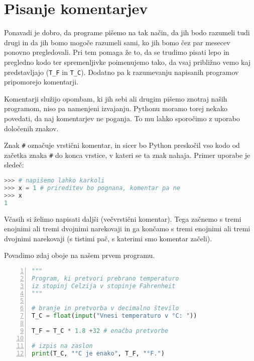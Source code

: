 \section{Pisanje komentarjev}
Ponavadi je dobro, da programe pišemo na tak način, da jih bodo razumeli tudi drugi in da jih bomo mogoče razumeli sami, ko jih bomo čez par mesecev ponovno  pregledovali. Pri tem pomaga že to, da se trudimo pisati lepo in pregledno kodo ter spremenljivke poimenujemo tako, da vsaj približno vemo kaj predstavljajo (\texttt{T\_F} in \texttt{T\_C}). Dodatno pa k razumevanju napisanih programov pripomorejo komentarji.

Komentarji služijo opombam, ki jih sebi ali drugim pišemo znotraj naših programom, niso pa namenjeni izvajanju. Pythonu moramo torej nekako povedati, da naj komentarjev ne poganja. To mu lahko sporočimo z uporabo določenih znakov. 

Znak \texttt{\#} označuje vrstični komentar, in sicer bo Python preskočil vso kodo od začetka znaka \texttt{\#} do konca vrstice, v kateri se ta znak nahaja. Primer uporabe je sledeč:
\begin{lstlisting}[language=Python]
>>> # napišemo lahko karkoli
>>> x = 1 # prireditev bo pognana, komentar pa ne
>>> x
1
\end{lstlisting}

Včasih si želimo napisati daljši (večvrstični komentar). Tega začnemo s tremi enojnimi ali tremi dvojnimi narekovaji in ga končamo s tremi enojnimi ali tremi dvojnimi narekovaji (s tistimi pač, s katerimi smo komentar začeli).

Povadimo zdaj oboje na našem prvem programu.
\begin{lstlisting}[language=Python,numbers=left]
"""
Program, ki pretvori prebrano temperaturo 
iz stopinj Celzija v stopinje Fahrenheit
"""

# branje in pretvorba v decimalno število
T_C = float(input("Vnesi temperaturo v °C: ")) 

T_F = T_C * 1.8 +32 # enačba pretvorbe

# izpis na zaslon
print(T_C, "°C je enako", T_F, "°F.") 
\end{lstlisting}



